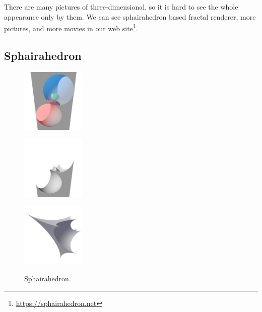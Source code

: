 \documentclass[suppldata, dvipdfmx]{interact}
\theoremstyle{plain}%
\theoremstyle{definition}
\theoremstyle{remark}
\theoremstyle{problemstyle}
\begin{document}
There are many pictures of three-dimensional, so it is hard to see the whole
appearance only by them. We can see sphairahedron based fractal renderer,
 more pictures, and more movies in
our web site\footnote{\url{https://sphairahedron.net}}.

\subsection{Sphairahedron}

\begin{figure}[h!tbp]
  \begin{minipage}[t]{0.3\textwidth}
   \centering
   \includegraphics[width=1.2in, height=1.2in, keepaspectratio]
   {./img/sphairahedralPrism/sphairaAll.png}
   \label{fig:sphairaPrismAll}
  \end{minipage}
  \hspace*{\fill}
  \begin{minipage}[t]{0.3\textwidth}
   \centering
   \includegraphics[width=1.2in, height=1.2in, keepaspectratio]
   {./img/sphairahedralPrism/sphairaHalf.png}
   \label{fig:sphairaPrismHalf}
  \end{minipage}
  \hspace*{\fill}
  \begin{minipage}[t]{0.3\textwidth}
   \centering
   \includegraphics[width=1.2in, height=1.2in,
   keepaspectratio]{./img/sphairahedralPrism/sphairahedron.png} 
   \label{fig:sphairahedronFinite}
  \end{minipage}
  \hspace*{\fill}
  \caption{Sphairahedron.}
  \label{fig:sphairahedron}
 \end{figure}
\end{document}
